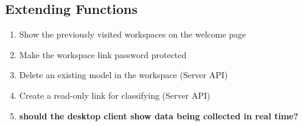 \subsection{Extending Functions}
\begin{enumerate}[resume*]
    \item Show the previously visited workspaces on the welcome page
    \item Make the workspace link password protected
    \item Delete an existing model in the workspace (Server API)
    \item Create a read-only link for classifying (Server API)
    \item \textbf{should the desktop client show data being collected in real time?}
\end{enumerate}
